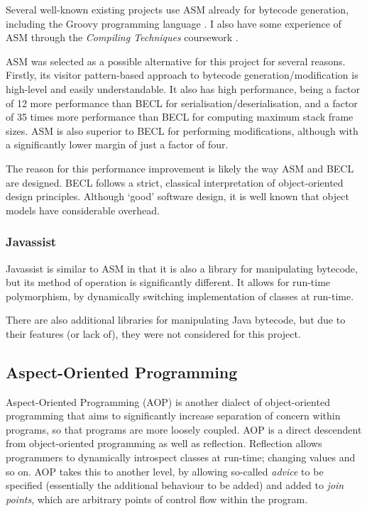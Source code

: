		Several well-known existing projects use ASM already for bytecode generation, including the Groovy programming language \citep{GroovyDocs}. I also have some experience of ASM through the \textit{Compiling Techniques} coursework \citep{CTcoursework}.
		
		ASM was selected as a possible alternative for this project for several reasons. Firstly, its visitor pattern-based approach to bytecode generation/modification is high-level and easily understandable. It also has high performance, being a factor of 12 more performance than BECL for serialisation/deserialisation, and a factor of 35 times more performance than BECL for computing maximum stack frame sizes. ASM is also superior to BECL for performing modifications, although with a significantly lower margin of just a factor of four.
		
		The reason for this performance improvement is likely the way ASM and BECL are designed. BECL follows a strict, classical interpretation of object-oriented design principles. Although `good' software design, it is well known that object models have considerable overhead.

		\subsubsection{Javassist} \label{sec:instrumentation/alt-instr/bytecode-instr/javassist}
		Javassist \citep{Chiba1998} is similar to ASM in that it is also a library for manipulating bytecode, but its method of operation is significantly different. It allows for run-time polymorphism, by dynamically switching implementation of classes at run-time.
	
		There are also additional libraries for manipulating Java bytecode, but due to their features (or lack of), they were not considered for this project.

	\subsection{Aspect-Oriented Programming} \label{sec:instrumentation/alt-instr/aop}
	Aspect-Oriented Programming (AOP) \citep{Kiczales1997} is another dialect of object-oriented programming that aims to significantly increase separation of concern within programs, so that programs are more loosely coupled. AOP is a direct descendent from object-oriented programming as well as reflection. Reflection allows programmers to dynamically introspect classes at run-time; changing values and so on. AOP takes this to another level, by allowing so-called \textit{advice} to be specified (essentially the additional behaviour to be added) and added to \textit{join points}, which are arbitrary points of control flow within the program.
	
